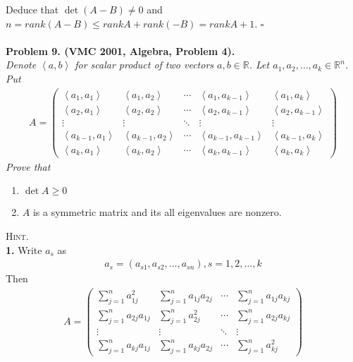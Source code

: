 \documentclass{article}
\numberwithin{equation}{section}
\begin{document}
Deduce that $\det \left( {A - B} \right) \ne 0$ and $n = rank\left( {A - B} \right) \le rankA + rank\left( { - B} \right) = rankA + 1$. \hfill $\square$\\
\\
\textbf{Problem 9. (VMC 2001, Algebra, Problem 4).}\\
\textit{Denote $\left\langle {a,b} \right\rangle $ for scalar product of two vectors $a,b \in \mathbb{R}$. Let ${a_1},{a_2}, \ldots ,{a_k} \in {\mathbb{R}^n}$. Put
\begin{align}
A = \left( {\begin{array}{*{20}{c}}
{\left\langle {{a_1},{a_1}} \right\rangle }&{\left\langle {{a_1},{a_2}} \right\rangle }& \cdots &{\left\langle {{a_1},{a_{k - 1}}} \right\rangle }&{\left\langle {{a_1},{a_k}} \right\rangle }\\
{\left\langle {{a_2},{a_1}} \right\rangle }&{\left\langle {{a_2},{a_2}} \right\rangle }& \cdots &{\left\langle {{a_2},{a_{k - 1}}} \right\rangle }&{\left\langle {{a_2},{a_{k - 1}}} \right\rangle }\\
 \vdots & \vdots & \ddots & \vdots & \vdots \\
{\left\langle {{a_{k - 1}},{a_1}} \right\rangle }&{\left\langle {{a_{k - 1}},{a_2}} \right\rangle }& \cdots &{\left\langle {{a_{k - 1}},{a_{k - 1}}} \right\rangle }&{\left\langle {{a_{k - 1}},{a_k}} \right\rangle }\\
{\left\langle {{a_k},{a_1}} \right\rangle }&{\left\langle {{a_k},{a_2}} \right\rangle }& \cdots &{\left\langle {{a_k},{a_{k - 1}}} \right\rangle }&{\left\langle {{a_k},{a_k}} \right\rangle }
\end{array}} \right)
\end{align}
Prove that}
\begin{enumerate}
\item $\det A \ge 0$
\item $A$ is a symmetric matrix and its all eigenvalues are nonzero. 
\end{enumerate}
\textsc{Hint.} \\
\textbf{1.} Write $a_s$ as
\begin{align}
{a_s} = \left( {{a_{s1}},{a_{s2}}, \ldots ,{a_{sn}}} \right),s = 1,2, \ldots ,k
\end{align}
Then 
\begin{align}
A = \left( {\begin{array}{*{20}{c}}
{\sum\limits_{j = 1}^n {a_{1j}^2} }&{\sum\limits_{j = 1}^n {{a_{1j}}{a_{2j}}} }& \cdots &{\sum\limits_{j = 1}^n {{a_{1j}}{a_{kj}}} }\\
{\sum\limits_{j = 1}^n {{a_{2j}}{a_{1j}}} }&{\sum\limits_{j = 1}^n {a_{2j}^2} }& \cdots &{\sum\limits_{j = 1}^n {{a_{2j}}{a_{kj}}} }\\
 \vdots & \vdots & \ddots & \vdots \\
{\sum\limits_{j = 1}^n {{a_{kj}}{a_{1j}}} }&{\sum\limits_{j = 1}^n {{a_{kj}}{a_{2j}}} }& \cdots &{\sum\limits_{j = 1}^n {a_{kj}^2} }
\end{array}} \right)
\end{align}
\end{document}
